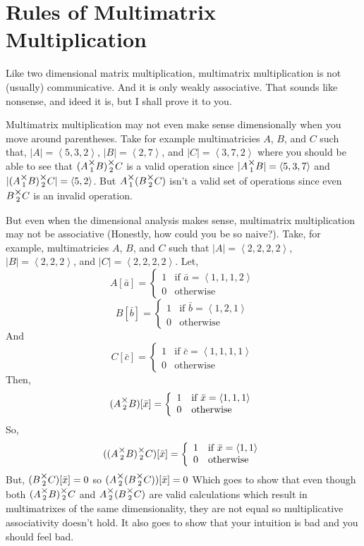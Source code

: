 \documentclass[12pt]{book}
\theoremstyle{plain}
\theoremstyle{definition}
\theoremstyle{ppart}
\theoremstyle{case}
\theoremstyle{solution}
\newcommand{\mmult}[1]{\text{\raisebox{1ex}{$\underset{#1}{\times}$}}}
\begin{document}
\section{Rules of Multimatrix Multiplication}

Like two dimensional matrix multiplication, multimatrix multiplication is
not (usually) communicative. And it is only weakly associative. That sounds like
nonsense, and ideed it is, but I shall prove it to you.

Multimatrix multiplication may not even make sense dimensionally when you move
around parentheses. Take for example multimatricies $A$, $B$, and $C$ such that,
$|A| = \left<5,3,2\right>$,
$|B| = \left<2,7\right>$, and
$|C| = \left<3,7,2\right>$ where you should be able to see that
$(A \mmult{1} B) \mmult{2} C$ is a valid operation since
$|A \mmult{1} B| = \left<5,3,7\right>$ and
$|(A \mmult{1} B) \mmult{2} C| = \left<5,2\right>$. But
$A \mmult{1} (B \mmult{2} C)$ isn't a valid set of operations since even
$B \mmult{2} C$ is an invalid operation.

But even when the dimensional analysis makes sense, multimatrix multiplication
may not be associative (Honestly, how could you be so naive?). 
Take, for example, multimatricies $A$, $B$, and $C$ such
that $|A| = \left<2,2,2,2\right>$, $|B| = \left<2,2,2\right>$, and
$|C| = \left<2,2,2,2\right>$. Let,
\[
 A[\bar{a}] = 
  \left\{
    \begin{array}{ll}
      1 & \mbox{if } \bar{a} = \left<1,1,1,2\right> \\
      0 & \mbox{otherwise}
    \end{array}
  \right.
\]
\[
 B[\bar{b}] = 
  \left\{
    \begin{array}{ll}
      1 & \mbox{if } \bar{b} = \left<1,2,1\right> \\
      0 & \mbox{otherwise}
    \end{array}
  \right.
\]
And
\[
 C[\bar{c}] = 
  \left\{
    \begin{array}{ll}
      1 & \mbox{if } \bar{c} = \left<1,1,1,1\right> \\
      0 & \mbox{otherwise}
    \end{array}
  \right.
\]
Then,
\[
 (A \mmult{2} B)[\bar{x}] = 
  \left\{
    \begin{array}{ll}
      1 & \mbox{if } \bar{x} = \left<1,1,1\right> \\
      0 & \mbox{otherwise}
    \end{array}
  \right.
\]
So,
\[
 ((A \mmult{2} B) \mmult{2} C)[\bar{x}] = 
  \left\{
    \begin{array}{ll}
      1 & \mbox{if } \bar{x} = \left<1,1\right> \\
      0 & \mbox{otherwise}
    \end{array}
  \right.
\]
But, $(B \mmult{2} C)[\bar{x}] = 0$ so $(A \mmult{2} (B \mmult{2} C))[\bar{x}] = 0$
Which goes to show that even though both $(A \mmult{2} B) \mmult{2} C$ and
$A \mmult{2} (B \mmult{2} C)$ are valid calculations which result in multimatrixes
of the same dimensionality, they are not equal so multiplicative associativity
doesn't hold. It also goes to show that your intuition is bad and you should feel bad.
\end{document}
